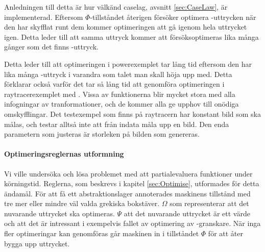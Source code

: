 \documentclass[Rapport]{subfiles}
\begin{document}
Anledningen till detta är hur välkänd caselag, avsnitt \ref{sec:CaseLaw}, är 
implementerad. Eftersom $\Phi$-tillståndet återigen försöker optimera -uttrycken
när den har skyfflat runt dem kommer optimeringen att gå igenom hela uttrycket igen.
Detta leder till att samma uttryck kommer att försöksoptimeras lika många gånger
som det finns -uttryck.  

Detta leder till att optimeringen i powerexemplet tar lång tid eftersom den har lika
många -uttryck i varandra som talet man skall höja upp med.
Detta förklarar också varför det tar så lång tid att genomföra optimeringen
i raytracerexemplet med . Vissa av funktionerna blir mycket stora med alla infogningar
av tranformationer, och de kommer alla ge upphov till onödiga omskyfflingar.
Det testexempel som finns på raytracern har konstant bild som ska målas, och
testar alltså inte att från indata måla upp en bild. Den enda parametern som
justeras är storleken på bilden som genereras.



\paragraph{Optimeringsreglernas utformning}
Vi ville undersöka och lösa problemet med att partialevaluera funktioner
under körningstid. Reglerna, som beskrevs i kapitel \ref{sec:Optimise}, 
utformades för detta ändamål. För att få ett abstraktionslager annoterades
maskinens tillstånd med tre mer eller mindre väl valda grekiska bokstäver.
$\Omega$ som representerar att det nuvarande uttrycket ska optimeras.
$\Psi$ att det nuvarande uttrycket är ett värde och att det är intressant
i exempelvis fallet av optimering av -granskare.
När inga fler optimeringar kan genomföras går maskinen in i tillståndet $\Phi$ 
för att åter bygga upp uttrycket.
\end{document}

